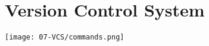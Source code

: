 

\section{Version Control System}

\begin{center}
    \texttt{[image: 07-VCS/commands.png]}
\end{center}

\vfill
$ $
\columnbreak